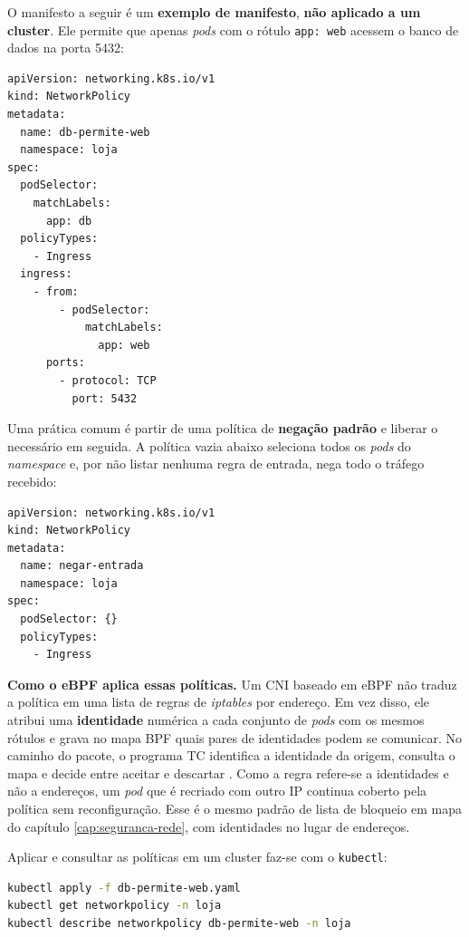O manifesto a seguir é um \textbf{exemplo de manifesto}, \textbf{não aplicado a um
cluster}. Ele permite que apenas \textit{pods} com o rótulo \texttt{app: web} acessem
o banco de dados na porta 5432:

\begin{lstlisting}[caption={NetworkPolicy que restringe o acesso ao banco de dados (exemplo de manifesto).}, label=lst:k8s-netpol]
apiVersion: networking.k8s.io/v1
kind: NetworkPolicy
metadata:
  name: db-permite-web
  namespace: loja
spec:
  podSelector:
    matchLabels:
      app: db
  policyTypes:
    - Ingress
  ingress:
    - from:
        - podSelector:
            matchLabels:
              app: web
      ports:
        - protocol: TCP
          port: 5432
\end{lstlisting}

Uma prática comum é partir de uma política de \textbf{negação padrão} e liberar o
necessário em seguida. A política vazia abaixo seleciona todos os \textit{pods} do
\textit{namespace} e, por não listar nenhuma regra de entrada, nega todo o tráfego
recebido:

\begin{lstlisting}[caption={Negação padrão de entrada em um namespace (exemplo de manifesto).}, label=lst:k8s-deny]
apiVersion: networking.k8s.io/v1
kind: NetworkPolicy
metadata:
  name: negar-entrada
  namespace: loja
spec:
  podSelector: {}
  policyTypes:
    - Ingress
\end{lstlisting}

\textbf{Como o eBPF aplica essas políticas.} Um CNI baseado em eBPF não traduz a
política em uma lista de regras de \textit{iptables} por endereço. Em vez disso, ele
atribui uma \textbf{identidade} numérica a cada conjunto de \textit{pods} com os mesmos
rótulos e grava no mapa BPF quais pares de identidades podem se comunicar. No
caminho do pacote, o programa TC identifica a identidade da origem, consulta o mapa e
decide entre aceitar e descartar \cite{ciliumdocs}. Como a regra refere-se a
identidades e não a endereços, um \textit{pod} que é recriado com outro IP continua
coberto pela política sem reconfiguração. Esse é o mesmo padrão de lista de
bloqueio em mapa do capítulo \ref{cap:seguranca-rede}, com identidades no lugar de
endereços.

Aplicar e consultar as políticas em um cluster faz-se com o \texttt{kubectl}:

\begin{lstlisting}[language=bash, caption={Aplicação e consulta de políticas com kubectl (comando de cluster, não executado).}, label=lst:k8s-kubectl-netpol]
kubectl apply -f db-permite-web.yaml
kubectl get networkpolicy -n loja
kubectl describe networkpolicy db-permite-web -n loja
\end{lstlisting}

